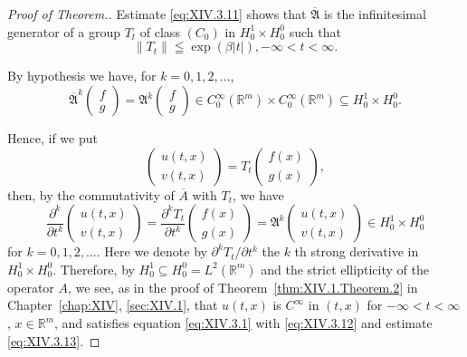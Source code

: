 \begin{proof}[Proof of Theorem.]
Estimate \eqref{eq:XIV.3.11} shows that $\overline{\mathfrak{A}}$ is the infinitesimal generator of a group $T_{t}$ of class $(C_0)$ in $H_0^1 \times H_0^0$ such that
\begin{equation}\label{eq:XIV.3.14}
\left\| T _{t} \right\| \leqq \exp (\beta | t |), - \infty < t < \infty .
\end{equation}

By hypothesis we have, for $k = 0, 1, 2, \ldots$, 
\[
\overline {{\mathfrak {A}}} ^{k} \begin{pmatrix}f \\ g\end{pmatrix} = \mathfrak {A} ^{k} \begin{pmatrix}f \\ g\end{pmatrix} \in C _{0} ^{\infty} (\mathbb{R}^{m}) \times C _{0} ^{\infty} (\mathbb{R}^{m}) \subseteq H _{0} ^{1} \times H _{0} ^{0}.
\]

Hence, if we put 
\[
\begin{pmatrix}u (t, x) \\ v (t, x)\end{pmatrix} = T _{t} \begin{pmatrix}f (x) \\ g (x)\end{pmatrix},
\]
then, by the commutativity of $\overline{A}$ with $T_{t}$, we have 
\[
\frac {\partial^{k}}{\partial t ^{k}} \begin{pmatrix}u (t, x) \\ v (t, x)\end{pmatrix} = \frac {\partial^{k} T _{t}}{\partial t ^{k}} \begin{pmatrix}f (x) \\ g (x)\end{pmatrix} = \mathfrak {A} ^{k} \begin{pmatrix}u (t, x) \\ v (t, x)\end{pmatrix} \in H _{0} ^{1} \times H _{0} ^{0}
\]
for $k = 0, 1, 2, \ldots$. Here we denote by $\partial^k T_t / \partial t^k$ the $k$ th strong derivative in $H_0^1 \times H_0^0$. Therefore, by $H_0^1 \subseteq H_0^0 = L^2(\mathbb{R}^{m})$ and the strict ellipticity of the operator $A$, we see, as in the proof of Theorem~\ref{thm:XIV.1.Theorem.2} in Chapter~\ref{chap:XIV}, \ref{sec:XIV.1}, that $u(t, x)$ is $C^\infty$ in $(t, x)$ for $-\infty < t < \infty$, $x \in \mathbb{R}^{m}$, and satisfies equation \eqref{eq:XIV.3.1} with \eqref{eq:XIV.3.12} and estimate \eqref{eq:XIV.3.13}. 
\end{proof}

